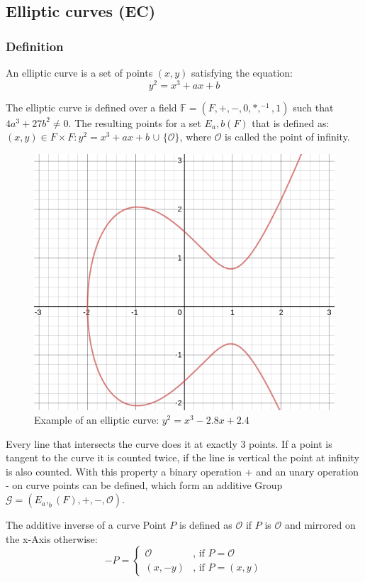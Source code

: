 \documentclass[a4paper,12pt]{scrartcl}
\begin{document}
\subsection{Elliptic curves (EC)}
\subsubsection{Definition}
An elliptic curve is a set of points \((x,y)\) satisfying the equation:
\begin{equation*}
y^2 = x^3 + ax + b
\end{equation*}

The elliptic curve is defined over a field $\mathbb{F} = (F, +, -, 0, *, ^{-1}, 1)$ such that $4a^{3} + 27b^{2} \neq 0$.
The resulting points for a set $E_a,b (F)$ that is defined as: ${(x,y) \in F \times F: y^{2} = x^{3} + ax + b}$ $\cup$ $\{\mathcal{O}\}$, where $\mathcal{O}$ is called the point of infinity.

\begin{figure}[hbt!]
	\centering
	\includegraphics[width=0.5\linewidth]{ec1}
	\caption[]{Example of an elliptic curve: $y^2 = x^3 - 2.8x + 2.4$}
	\label{fig:ec-b2}
\end{figure}


Every line that intersects the curve does it at exactly 3 points. If a point is tangent to the curve it is counted twice, if the line is vertical the point at infinity is also counted. With this property a binary operation + and an unary operation - on curve points can be defined, which form an additive Group $\mathcal{G} = (E_a,_b (F), +, -, \mathcal{O})$.

The additive inverse of a curve Point $P$ is defined as $\mathcal{O}$ if $P$ is $\mathcal{O}$ and mirrored on the x-Axis otherwise:
\[
-P =
\begin{cases}
\mathcal{O} & \text{, if } P = \mathcal{O} \\
(x,-y) & \text{, if } P = (x,y)
\end{cases}
\]
\end{document}
